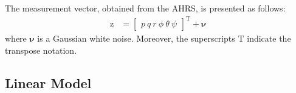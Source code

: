 \documentclass[3p]{elsarticle}
\begin{document}
The measurement vector, obtained from the AHRS, is presented as follows:
\begin{equation}
    \begin{split}
        \boldsymbol{\mathrm{z}} &= \begin{bmatrix}
        p \
        q \
        r \
        \phi \
        \theta \
        \psi
    \end{bmatrix}^\mathrm{T} + \boldsymbol{\nu}
    \end{split}
\end{equation}
where $\boldsymbol{\nu}$ is a Gaussian white noise. Moreover, the superscripts $\mathrm{T}$ indicate the transpose notation.
\subsection{Linear Model}
\end{document}
